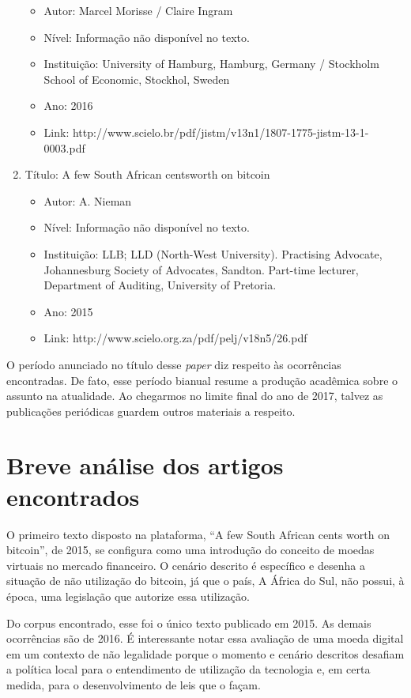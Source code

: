 \documentclass[12pt]{article}
\begin{document}
\begin{enumerate}[I]
\begin{itemize}
\item Autor: 
Marcel Morisse / Claire Ingram
\item Nível: Informação não disponível no texto.
\item Instituição: University of Hamburg, Hamburg, Germany / Stockholm School of Economic, Stockhol, Sweden
\item Ano: 
2016
\item Link: 
http://www.scielo.br/pdf/jistm/v13n1/1807-1775-jistm-13-1-0003.pdf
\end{itemize}


\item Título: A few South African centsworth on bitcoin
\begin{itemize}

\item Autor: 
A. Nieman
\item Nível: Informação não disponível no texto.
\item Instituição: LLB; LLD (North-West University). Practising Advocate, Johannesburg Society of Advocates, Sandton. Part-time lecturer, Department of Auditing, University of Pretoria.
\item Ano: 
2015
\item Link: 
http://www.scielo.org.za/pdf/pelj/v18n5/26.pdf
\end{itemize}

\end{enumerate}

O período anunciado no título desse \textit{paper} diz respeito às ocorrências encontradas. De fato, esse período bianual resume a produção acadêmica sobre o assunto na atualidade. Ao chegarmos no limite final do ano de 2017, talvez as publicações periódicas guardem outros materiais a respeito.

\section{Breve análise dos artigos encontrados}

O primeiro texto disposto na plataforma, “A few South African cents worth on bitcoin”, de 2015, se configura como uma introdução do conceito de moedas virtuais no mercado financeiro. O cenário descrito é específico e desenha a situação de não utilização do bitcoin, já que o país, A África do Sul, não possui, à época, uma legislação que autorize essa utilização.

Do corpus encontrado, esse foi o único texto publicado em 2015. As demais ocorrências são de 2016. É interessante notar essa avaliação de uma moeda digital em um contexto de não legalidade porque o momento e cenário descritos desafiam a política local para o entendimento de utilização da tecnologia e, em certa medida, para o desenvolvimento de leis que o façam.
\end{document}
